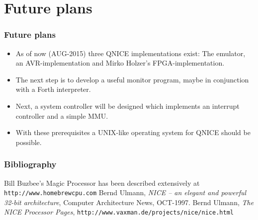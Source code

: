 \documentclass{beamer}
\begin{document}
 \section{Future plans}
  \begin{frame}
   \frametitle{Future plans}
   \begin{itemize}
    \item As of now (AUG-2015) three QNICE implementations exist: The
     emulator, an AVR-implementation and Mirko Holzer's 
     FPGA-implementation.
    \item The next step is to develop a useful monitor program, maybe
     in conjunction with a Forth interpreter.
    \item Next, a system controller will be designed which implements
     an interrupt controller and a simple MMU.
    \item With these prerequisites a UNIX-like operating system for
     QNICE should be possible.
   \end{itemize}
  \end{frame}
%
 \begin{frame}
  \frametitle{Bibliography}
  \begin{thebibliography}{9}
    Bill Buzbee's Magic Processor has been described extensively at 
    {\tt http://www.homebrewcpu.com}
    Bernd Ulmann, \emph{NICE -- an elegant and powerful 32-bit architecture},
    Computer Architecture News, OCT-1997.
    Bernd Ulmann, \emph{The NICE Processor Pages}, 
    {\tt http://www.vaxman.de/projects/nice/nice.html}
  \end{thebibliography}
 \end{frame}
\end{document}
